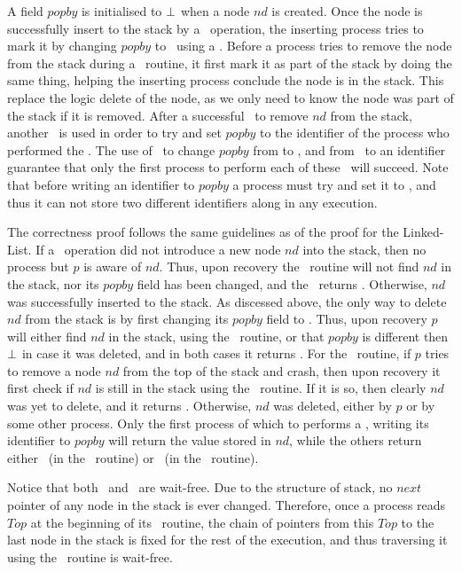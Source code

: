 A field $popby$ is initialised to $\mbox{$\bot$}$ when a node $nd$ is created. Once the node is successfully insert to the stack by a \push\ operation, the inserting process tries to mark it by changing $popby$ to \NULL\ using a \CAS. Before a process tries to remove the node from the stack during a \pop\ routine, it first mark it as part of the stack by doing the same thing, helping the inserting process conclude the node is in the stack. This replace the logic delete of the node, as we only need to know the node was part of the stack if it is removed. After a successful \CAS\ to remove $nd$ from the stack, another \CAS\ is used in order to try and set $popby$ to the identifier of the process who performed the \CAS. The use of \CAS\ to change $popby$ from \init to \NULL, and from \NULL\ to an identifier guarantee that only the first process to perform each of these \CAS\ will succeed. Note that before writing an identifier to $popby$ a process must try and set it to \NULL, and thus it can not store two different identifiers along in any execution. 

The correctness proof follows the same guidelines as of the proof for the Linked-List. If a \push\ operation did not introduce a new node $nd$ into the stack, then no process but $p$ is aware of $nd$. Thus, upon recovery the \search\ routine will not find $nd$ in the stack, nor its $popby$ field has been changed, and the \recoverPush\ returns \fail. Otherwise, $nd$ was successfully inserted to the stack. As discessed above, the only way to delete $nd$ from the stack is by first changing its $popby$ field to \NULL. Thus, upon recovery $p$ will either find $nd$ in the stack, using the \search\ routine, or that $popby$ is different then $\mbox{$\bot$}$ in case it was deleted, and in both cases it returns \True.
For the \pop\ routine, if $p$ tries to remove a node $nd$ from the top of the stack and crash, then upon recovery it first check if $nd$ is still in the stack using the \search\ routine. If it is so, then clearly $nd$ was yet to delete, and it returns \fail. Otherwise, $nd$ was deleted, either by $p$ or by some other process. Only the first process of which to performs a \CAS, writing its identifier to $popby$ will return the value stored in $nd$, while the others return either \init\ (in the \trypop\ routine) or \fail\ (in the \recoverPop\ routine).

Notice that both \recoverPush\ and \recoverPop\ are wait-free. Due to the structure of stack, no $next$ pointer of any node in the stack is ever changed. Therefore, once a process reads $Top$ at the beginning of its \recover\ routine, the chain of pointers from this $Top$ to the last node in the stack is fixed for the rest of the execution, and thus traversing it using the \search\ routine is wait-free.

